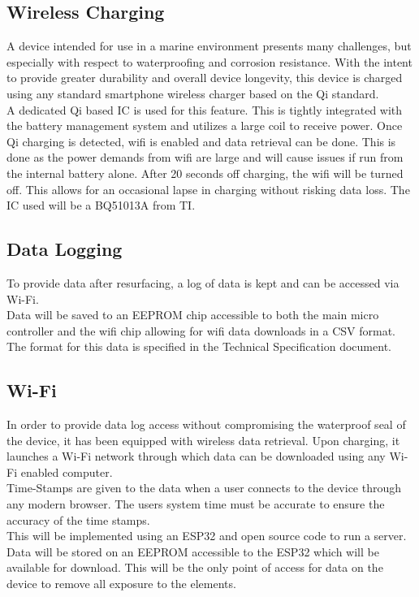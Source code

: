 \documentclass{article}
\begin{document}
\subsection{Wireless Charging}
A device intended for use in a marine environment presents many challenges, but especially with respect to waterproofing and corrosion resistance. With the intent to provide greater durability and overall device longevity, this device is charged using any standard smartphone wireless charger based on the Qi standard.\\[12pt]
A dedicated Qi based IC is used for this feature. This is tightly integrated with the battery management system and utilizes a large coil to receive power. Once Qi charging is detected, wifi is enabled and data retrieval can be done. This is done as the power demands from wifi are large and will cause issues if run from the internal battery alone. After 20 seconds off charging, the wifi will be turned off. This allows for an occasional lapse in charging without risking data loss. The IC used will be a BQ51013A from TI.

\subsection{Data Logging}
To provide data after resurfacing, a log of data is kept and can be accessed via Wi-Fi.\\[12pt]
Data will be saved to an EEPROM chip accessible to both the main micro controller and the wifi chip allowing for wifi data downloads in a CSV format. The format for this data is specified in the Technical Specification document.

\subsection{Wi-Fi}
In order to provide data log access without compromising the waterproof seal of the device, it has been equipped with wireless data retrieval. Upon charging, it launches a Wi-Fi network through which data can be downloaded using any Wi-Fi enabled computer.\\[12pt]
Time-Stamps are given to the data when a user connects to the device through any modern browser. The users system time must be accurate to ensure the accuracy of the time stamps.\\[12pt]
This will be implemented using an ESP32 and open source code to run a server. Data will be stored on an EEPROM accessible to the ESP32 which will be available for download. This will be the only point of access for data on the device to remove all exposure to the elements.
\end{document}
